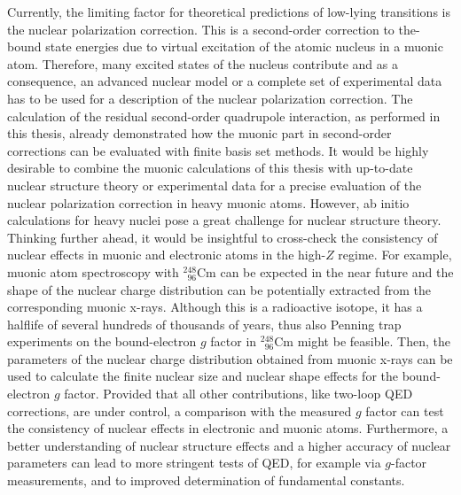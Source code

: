 Currently, the limiting factor for theoretical predictions of low-lying transitions is the nuclear polarization correction. This is a second-order correction to the-bound state energies due to virtual excitation of the atomic nucleus in a muonic atom. Therefore, many excited states of the nucleus contribute and as a consequence, an advanced nuclear model or a complete set of experimental data has to be used for a description of the nuclear polarization correction.
The calculation of the residual second-order quadrupole interaction, as performed in this thesis, already demonstrated how the muonic part in second-order corrections can be evaluated with finite basis set methods. It would be highly desirable to combine the muonic calculations of this thesis with up-to-date nuclear structure theory or experimental data for a precise evaluation of the nuclear polarization correction in heavy muonic atoms. However, ab initio calculations for heavy nuclei pose a great challenge for nuclear structure theory.\\[11pt]%
%
Thinking further ahead, it would be insightful to cross-check the consistency of nuclear effects in muonic and electronic atoms in the high-$Z$ regime. 
For example, muonic atom spectroscopy with $_{\phantom{1}96}^{248}$Cm can be expected in the near future and the shape of the nuclear charge distribution can be potentially extracted from the corresponding muonic x-rays. Although this is a radioactive isotope, it has a halflife of several hundreds of thousands of years, thus also Penning trap experiments on the bound-electron $g$ factor in $_{\phantom{1}96}^{248}$Cm might be feasible. Then, the parameters of the nuclear charge distribution obtained from muonic x-rays can be used to calculate the finite nuclear size and nuclear shape effects for the bound-electron $g$ factor. Provided that all other contributions, like two-loop QED corrections, are under control, a comparison with the measured $g$ factor can test the consistency of nuclear effects in electronic and muonic atoms. 
Furthermore, a better understanding of nuclear structure effects and a higher accuracy of nuclear parameters can lead to more stringent tests of QED, for example via $g$-factor measurements, and to improved determination of fundamental constants.

%
 






